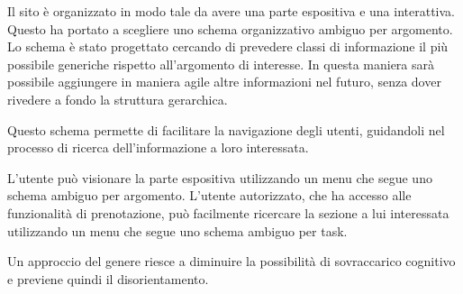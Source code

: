 Il sito è organizzato in modo tale da avere una parte espositiva e una interattiva.
Questo ha portato a scegliere uno schema organizzativo ambiguo per argomento. Lo schema è stato progettato cercando di prevedere classi di informazione il più possibile generiche rispetto all'argomento di interesse. In questa maniera sarà possibile aggiungere in maniera agile altre informazioni nel futuro, senza dover rivedere a fondo la struttura gerarchica.

Questo schema permette di facilitare la navigazione degli utenti, guidandoli nel processo di ricerca dell'informazione a loro interessata. 

L'utente può visionare la parte espositiva utilizzando un menu che segue uno schema ambiguo per argomento. L'utente autorizzato, che ha accesso alle funzionalità di prenotazione, può facilmente ricercare la sezione a lui interessata utilizzando un menu che segue uno schema ambiguo per task.

Un approccio del genere riesce a diminuire la possibilità di sovraccarico cognitivo e previene quindi il disorientamento.